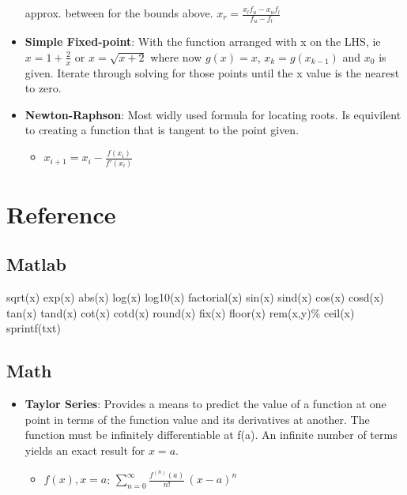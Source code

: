\documentclass[fontsize=4pt]{scrartcl}
\begin{document}
\begin{multicols}{4}
\begin{itemize}
          approx. between for the bounds above.
          $x_r = \frac{x_lf_u-x_uf_l}{f_u-f_l}$
        \item \textbf{Simple Fixed-point}: With the function arranged with x on the LHS, ie $x = 1+\frac{2}{x}$ or
          $x = \sqrt{x+2}$ where now $g(x) = x$, $x_k = g(x_{k-1})$ and $x_0$ is given. Iterate through solving
          for those points until the x value is the nearest to zero.
        \item \textbf{Newton-Raphson}: Most widly used formula for locating roots. Is equivilent to creating a 
        function that is tangent to the point given.
          \begin{itemize}
            \item $x_{i+1} = x_i - \frac{f(x_i)}{f'(x_i)}$
          \end{itemize}

      \end{itemize}

  \columnbreak

  \section{Reference}
    \subsection{Matlab}
      sqrt(x)
      exp(x)
      abs(x) 
      log(x)
      log10(x)
      factorial(x)
      sin(x)
      sind(x)
      cos(x)
      cosd(x)
      tan(x)
      tand(x)
      cot(x)
      cotd(x)
      round(x)
      fix(x)
      floor(x)
      rem(x,y)\%
      ceil(x)
      sprintf(txt)
    \subsection{Math}
      \begin{itemize}
      \item \textbf{Taylor Series}: Provides a means to predict the value of a function at one point in terms of
             the function value and its derivatives at another. The function must be infinitely differentiable
             at f(a). An infinite number of terms yields an exact result for $x=a$.
        \begin{itemize}
          \item $f(x), x=a$: $\sum_{n=0} ^ {\infty} \frac {f^{(n)}(a)}{n!} \, (x-a)^{n}$
        \end{itemize}
      \end{itemize}
  \end{multicols}
\end{document}
